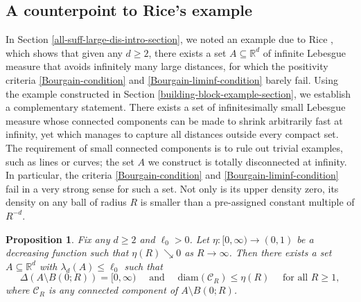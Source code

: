 \documentclass[a4paper,11pt]{amsart}
\newtheorem{prop}[thm]{\bf Proposition}
\numberwithin{equation}{section}
\begin{document}
\subsection{A counterpoint to Rice's example} \label{Rice-example-counterpoint}
In Section \ref{all-suff-large-dis-intro-section}, we noted an example due to Rice \cite{2020Rice}, which shows that given any $d \geq 2$, there exists a set $A \subseteq \mathbb R^d$ of infinite Lebesgue measure that avoids infinitely many large distances,  for which the positivity criteria \eqref{Bourgain-condition} and \eqref{Bourgain-liminf-condition} barely fail. Using the example constructed in Section \ref{building-block-example-section}, we establish a complementary statement. There exists a set of infinitesimally small Lebesgue measure whose connected components can be  made to shrink arbitrarily fast at infinity, yet which manages to capture all distances outside every compact set. The requirement of small connected components is to rule out trivial examples, such as lines or curves; the set $A$ we construct is totally disconnected at infinity. In particular, the criteria \eqref{Bourgain-condition} and \eqref{Bourgain-liminf-condition} fail in a very strong sense for such a set. Not only is its upper density zero, its density on any ball of radius $R$ is smaller than a pre-assigned constant multiple of $R^{-d}$.       
\begin{prop} \label{Rice-counterpoint-lemma} 
Fix any $d \geq 2$ and $\ell_0 > 0$. Let $\eta: [0, \infty) \rightarrow (0, 1)$ be a decreasing function such that $\eta(R) \searrow 0$ as $R \rightarrow \infty$. Then there exists a set $A \subseteq \mathbb R^d$ with $\lambda_d (A) \leq \ell_0$ such that 
\begin{equation} \label{density+distance} 
\Delta (A \setminus B(0;R)) = [0, \infty) \quad \text{ and } \quad \text{diam}(\mathscr{C}_R) \leq \eta(R) \quad \text{ for all $R \geq 1$},
\end{equation}  
where  $\mathscr{C}_R$ is any connected component of $A \setminus B(0;R)$. 
\end{prop} 
\end{document}
